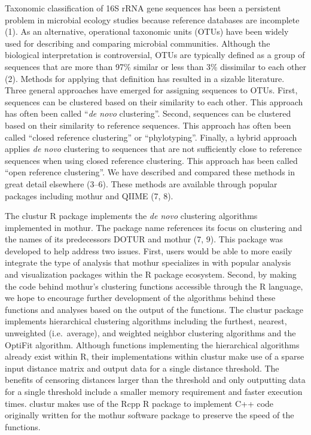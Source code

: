 \documentclass[
  11pt,
]{article}
\begin{document}
Taxonomic classification of 16S rRNA gene sequences has been a
persistent problem in microbial ecology studies because reference
databases are incomplete (1). As an alternative, operational taxonomic
units (OTUs) have been widely used for describing and comparing
microbial communities. Although the biological interpretation is
controversial, OTUs are typically defined as a group of sequences that
are more than 97\% similar or less than 3\% dissimilar to each other
(2). Methods for applying that definition has resulted in a sizable
literature. Three general approaches have emerged for assigning
sequences to OTUs. First, sequences can be clustered based on their
similarity to each other. This approach has often been called ``\emph{de
novo} clustering''. Second, sequences can be clustered based on their
similarity to reference sequences. This approach has often been called
``closed reference clustering'' or ``phylotyping''. Finally, a hybrid
approach applies \emph{de novo} clustering to sequences that are not
sufficiently close to reference sequences when using closed reference
clustering. This approach has been called ``open reference clustering''.
We have described and compared these methods in great detail elsewhere
(3--6). These methods are available through popular packages including
mothur and QIIME (7, 8).

The clustur R package implements the \emph{de novo} clustering
algorithms implemented in mothur. The package name references its focus
on clustering and the names of its predecessors DOTUR and mothur (7, 9).
This package was developed to help address two issues. First, users
would be able to more easily integrate the type of analysis that mothur
specializes in with popular analysis and visualization packages within
the R package ecosystem. Second, by making the code behind mothur's
clustering functions accessible through the R language, we hope to
encourage further development of the algorithms behind these functions
and analyses based on the output of the functions. The clustur package
implements hierarchical clustering algorithms including the furthest,
nearest, unweighted (i.e.~average), and weighted neighbor clustering
algorithms and the OptiFit algorithm. Although functions implementing
the hierarchical algorithms already exist within R, their
implementations within clustur make use of a sparse input distance
matrix and output data for a single distance threshold. The benefits of
censoring distances larger than the threshold and only outputting data
for a single threshold include a smaller memory requirement and faster
execution times. clustur makes use of the Rcpp R package to implement
C++ code originally written for the mothur software package to preserve
the speed of the functions.
\end{document}
